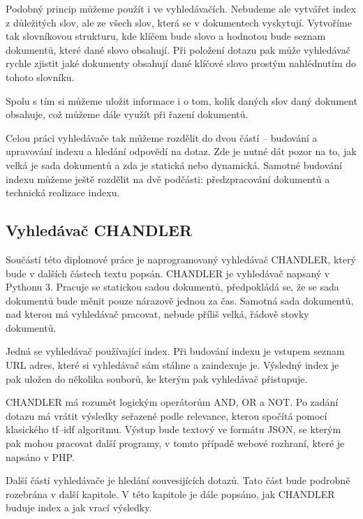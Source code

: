 \documentclass[12pt]{article}
\newcommand{\name}{CHANDLER}
\begin{document}
Podobný princip můžeme použít i ve vyhledávačích. Nebudeme ale vytvářet index z důležitých slov, ale ze všech slov, která se v dokumentech vyskytují. Vytvoříme tak slovníkovou strukturu, kde klíčem bude slovo a hodnotou bude seznam dokumentů, které dané slovo obsahují. Při položení dotazu pak může vyhledávač rychle zjistit jaké dokumenty obsahují dané klíčové slovo prostým nahlédnutím do tohoto slovníku. 

Spolu s tím si můžeme uložit informace i o tom, kolik daných slov daný dokument obsahuje, což můžeme dále využít při řazení dokumentů. 

Celou práci vyhledávače tak můžeme rozdělit do dvou částí -- budování a upravování indexu a hledání odpovědí na dotaz. Zde je nutné dát pozor na to, jak velká je sada dokumentů a zda je statická nebo dynamická. Samotné budování indexu můžeme ještě rozdělit na dvě podčásti: předzpracování dokumentů a technická realizace indexu. 

\subsection{Vyhledávač \name}

Součástí této diplomové práce je naprogramovaný vyhledávač \name, který bude v dalších částech textu popsán. \name{} je vyhledávač napsaný v Pythonu 3. Pracuje se statickou sadou dokumentů, předpokládá se, že se sada dokumentů bude měnit pouze nárazově jednou za čas. Samotná sada dokumentů, nad kterou má vyhledávač pracovat, nebude příliš velká, řádově stovky dokumentů. 

Jedná se vyhledávač používající index. Při budování indexu je vstupem seznam URL adres, které si vyhledávač sám stáhne a zaindexuje je. Výsledný index je pak uložen do několika souborů, ke kterým pak vyhledávač přistupuje. 

\name{} má rozumět logickým operátorům AND, OR a NOT. Po zadání dotazu má vrátit výsledky seřazené podle relevance, kterou spočítá pomocí klasického tf–idf algoritmu. Výstup bude textový ve formátu JSON, se kterým pak mohou pracovat další programy, v tomto případě webové rozhraní, které je napsáno v PHP. 

Další částí vyhledávače je hledání souvesijících dotazů. Tato část bude podrobně rozebrána v další kapitole. V této kapitole je dále popsáno, jak \name{} buduje index a jak vrací výsledky. 

\end{document}
